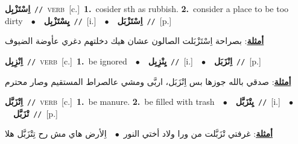 \documentclass[10pt,a4paper,twoside]{article} %
\begin{document}
\begin{multicols}{2}
{{{{{{{{\setlength\topsep{0pt}\textbf{\foreignlanguage{arabic}{اِسْتَزْبِل}}\ {\color{gray}\texttt{//}\color{black}}\ \textsc{verb}\ [c.]\ \textbf{1.}~cosider sth as rubbish.  \textbf{2.}~consider a place to be too dirty\ \ $\bullet$\ \ \setlength\topsep{0pt}\textbf{\foreignlanguage{arabic}{يِسْتَزْبِل}}\ {\color{gray}\texttt{//}\color{black}}\ [i.]\ \ $\bullet$\ \ \setlength\topsep{0pt}\textbf{\foreignlanguage{arabic}{اِسْتَزْبَل}}\ {\color{gray}\texttt{//}\color{black}}\ [p.]\  \begin{flushright}\color{gray}\foreignlanguage{arabic}{\textbf{\underline{\foreignlanguage{arabic}{أمثلة}}}: بصراحة اِسْتَزْبَلت الصالون عشان هيك دخلتهم دغري عأوضة الضيوف}\end{flushright}\color{black}} \vspace{2mm}

{\setlength\topsep{0pt}\textbf{\foreignlanguage{arabic}{اِنْزِبِل}}\ {\color{gray}\texttt{//}\color{black}}\ \textsc{verb}\ [c.]\ \textbf{1.}~be ignored\ \ $\bullet$\ \ \setlength\topsep{0pt}\textbf{\foreignlanguage{arabic}{يِنْزِبِل}}\ {\color{gray}\texttt{//}\color{black}}\ [i.]\ \ $\bullet$\ \ \setlength\topsep{0pt}\textbf{\foreignlanguage{arabic}{اِنْزَبَل}}\ {\color{gray}\texttt{//}\color{black}}\ [p.]\  \begin{flushright}\color{gray}\foreignlanguage{arabic}{\textbf{\underline{\foreignlanguage{arabic}{أمثلة}}}: صدقي بالله جوزها بس اِنْزَبَل، اربَّى ومشي عالصراط المستقيم وصار محترم}\end{flushright}\color{black}} \vspace{2mm}

{\setlength\topsep{0pt}\textbf{\foreignlanguage{arabic}{اِتْزَبَّل}}\ {\color{gray}\texttt{//}\color{black}}\ \textsc{verb}\ [c.]\ \textbf{1.}~be manure.  \textbf{2.}~be filled with trash\ \ $\bullet$\ \ \setlength\topsep{0pt}\textbf{\foreignlanguage{arabic}{يِتْزَبَّل}}\ {\color{gray}\texttt{//}\color{black}}\ [i.]\ \ $\bullet$\ \ \setlength\topsep{0pt}\textbf{\foreignlanguage{arabic}{تْزَبَّل}}\ {\color{gray}\texttt{//}\color{black}}\ [p.]\  \begin{flushright}\color{gray}\foreignlanguage{arabic}{\textbf{\underline{\foreignlanguage{arabic}{أمثلة}}}: غرفتي  تْزَبَّلت من ورا ولاد أختي النور\ $\bullet$\ \  اِلأرض هاي مش رح تِتْزَبَّل هلا}\end{flushright}\color{black}} \vspace{2mm}

}}}}}}}
\end{multicols}
\end{document}
